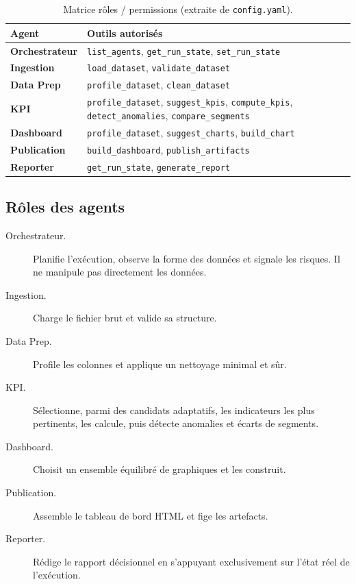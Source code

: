 \begin{table}[ht]
\centering\small
\caption{Matrice rôles / permissions (extraite de \texttt{config.yaml}).}
\label{tab:permissions}
\begin{tabularx}{\linewidth}{@{}lY@{}}
\toprule
\textbf{Agent} & \textbf{Outils autorisés} \\
\midrule
\textbf{Orchestrateur} & \texttt{list\_agents}, \texttt{get\_run\_state}, \texttt{set\_run\_state} \\
\textbf{Ingestion} & \texttt{load\_dataset}, \texttt{validate\_dataset} \\
\textbf{Data Prep} & \texttt{profile\_dataset}, \texttt{clean\_dataset} \\
\textbf{KPI} & \texttt{profile\_dataset}, \texttt{suggest\_kpis}, \texttt{compute\_kpis}, \texttt{detect\_anomalies}, \texttt{compare\_segments} \\
\textbf{Dashboard} & \texttt{profile\_dataset}, \texttt{suggest\_charts}, \texttt{build\_chart} \\
\textbf{Publication} & \texttt{build\_dashboard}, \texttt{publish\_artifacts} \\
\textbf{Reporter} & \texttt{get\_run\_state}, \texttt{generate\_report} \\
\bottomrule
\end{tabularx}
\end{table}

\subsection{Rôles des agents}
\begin{description}
  \item[Orchestrateur.] Planifie l'exécution, observe la forme des données et
    signale les risques. Il ne manipule pas directement les données.
  \item[Ingestion.] Charge le fichier brut et valide sa structure.
  \item[Data Prep.] Profile les colonnes et applique un nettoyage minimal et
    sûr.
  \item[KPI.] Sélectionne, parmi des candidats adaptatifs, les indicateurs les
    plus pertinents, les calcule, puis détecte anomalies et écarts de segments.
  \item[Dashboard.] Choisit un ensemble équilibré de graphiques et les
    construit.
  \item[Publication.] Assemble le tableau de bord HTML et fige les artefacts.
  \item[Reporter.] Rédige le rapport décisionnel en s'appuyant exclusivement
    sur l'état réel de l'exécution.
\end{description}

